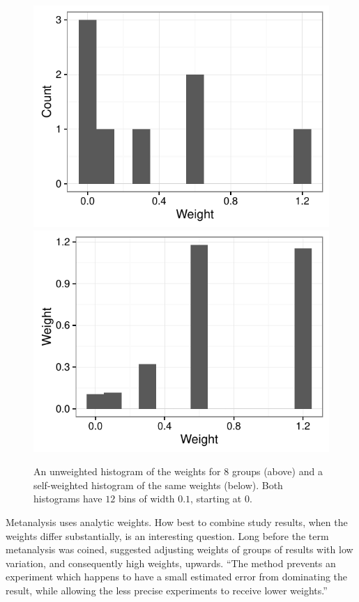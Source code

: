\documentclass{svmult}
\begin{document}
\begin{figure}
  \centering
  \includegraphics[width=\linewidth]{meta}
  \includegraphics[width=\linewidth]{meta-weighted}
  \caption{An unweighted histogram of the weights for $8$ groups (above) and a self-weighted histogram of the same weights (below).  Both histograms have $12$ bins of width $0.1$, starting at $0$.}
  \label{hc} 
\end{figure}

Metanalysis uses analytic weights.  How best to combine study results, when the weights differ substantially, is an interesting question.  Long before the term metanalysis was coined, \cite{cochran:1954b} suggested adjusting weights of groups of results with low variation, and consequently high weights, upwards.  ``The method prevents an experiment which happens to have a small estimated error from dominating the result, while allowing the less precise experiments to receive lower weights.''
\end{document}

